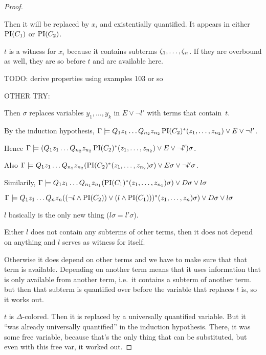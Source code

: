 \documentclass[,%
	paper=a4,%
	DIV14, 
	liststotoc,
	bibtotoc,
	draft=false,%
	numbers=noendperiod
]{scrartcl}
\begin{document}
\begin{proof}
{\begin{enumerate}
\begin{description}
						Then it will be replaced by $x_i$ and existentially quantified.
						It appears in either $\operatorname{PI}(C_1)$ or $\operatorname{PI}(C_2)$.

						$t$ is a witness for $x_i$ because it contains subterms $\zeta_{1}, \ldots, \zeta_{n}$. If they are overbound as well, they are so before $t$ and are available here.

						TODO: derive properties using examples 103 or so


				\end{description}

		\end{enumerate}
	}

	{ \color{gray}
		OTHER TRY: 

		Then $\sigma$ replaces variables $y_1, \ldots, y_k$ in $E \lor \lnot l'$ with terms that contain~$t$.

		By the induction hypothesis, $\Gamma \models Q_1 z_1 \ldots Q_{n_2} z_{n_2} \operatorname{PI}(C_2)^*(z_1, \ldots, z_{n_2})  \lor E \lor \lnot l'$.

		Hence $\Gamma \models (Q_1 z_1 \ldots Q_{n_2} z_{n_2} \operatorname{PI}(C_2)^*(z_1, \ldots, z_{n_2})  \lor E \lor \lnot l' ) \sigma$.

		Also $\Gamma \models Q_1 z_1 \ldots Q_{n_2} z_{n_2} (\operatorname{PI}(C_2)^*(z_1, \ldots, z_{n_2})\sigma)  \lor E\sigma \lor \lnot l'\sigma$.

		Similarily,
		$\Gamma \models Q_1 z_1 \ldots Q_{n_1} z_{n_1} (\operatorname{PI}(C_1)^*(z_1, \ldots, z_{n_1})\sigma)  \lor D\sigma \lor l\sigma$

		$\Gamma \models Q_1 z_1 \ldots Q_{n} z_{n} ( (\lnot l \land \operatorname{PI}(C_2)) \lor (l \land \operatorname{PI}(C_1))) ^*(z_1, \ldots, z_{n})\sigma)  \lor D\sigma \lor l\sigma$

		$l$ basically is the only new thing ($l\sigma = l'\sigma$).

		Either $l$ does not contain any subterms of other terms, then it does not depend on anything and $l$ serves as witness for itself.

		Otherwise it does depend on other terms and we have to make sure that that term is available.
		Depending on another term means that it uses information that is only available from another term,
		i.e.~it contains a subterm of another term. but then that subterm is quantified over before the variable that replaces $t$ is, so it works out.


	\item [$t$ is $\Delta$-colored.]
		Then it is replaced by a universally quantified variable.
		But it ``was already universally quantified'' in the induction hypothesis.
		There, it was some free variable, because that's the only thing that can be substituted, but even with this free var, it worked out.





	}
\end{proof}
\end{document}
